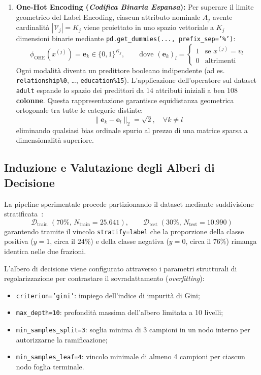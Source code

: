 \begin{enumerate}
    \item \textbf{One-Hot Encoding (\textit{Codifica Binaria Espansa}):}
    Per superare il limite geometrico del Label Encoding, ciascun attributo nominale $A_j$ avente cardinalità $|\mathcal{V}_j| = K_j$ viene proiettato in uno spazio vettoriale a $K_j$ dimensioni binarie mediante \texttt{pd.get\_dummies(..., prefix\_sep='\%')}:
    \begin{equation}
        \phi_{\text{OHE}}(x^{(j)}) = \mathbf{e}_k \in \{0, 1\}^{K_j}, \qquad \text{dove } (\mathbf{e}_k)_l = \begin{cases} 1 & \text{se } x^{(j)} = v_l \\ 0 & \text{altrimenti} \end{cases}
    \end{equation}
    Ogni modalità diventa un predittore booleano indipendente (ad es. \texttt{relationship\%0}, \dots, \texttt{education\%15}). L'applicazione dell'operatore sul dataset \texttt{adult} espande lo spazio dei predittori da $14$ attributi iniziali a ben \textbf{$108$ colonne}. Questa rappresentazione garantisce equidistanza geometrica ortogonale tra tutte le categorie distinte:
    \begin{equation}
        \|\mathbf{e}_k - \mathbf{e}_l\|_2 = \sqrt{2}, \quad \forall k \neq l
    \end{equation}
    eliminando qualsiasi bias ordinale spurio al prezzo di una matrice sparsa a dimensionalità superiore.
\end{enumerate}

\FloatBarrier
\subsection{Induzione e Valutazione degli Alberi di Decisione}
\label{subsec:dm-lab-dt}

La pipeline sperimentale procede partizionando il dataset mediante suddivisione stratificata~\cite{mannocci2026imbalanced}:
\begin{equation}
    \mathcal{D}_{\text{train}} \; (70\%, \, N_{\text{train}} = 25.641), \qquad \mathcal{D}_{\text{test}} \; (30\%, \, N_{\text{test}} = 10.990)
\end{equation}
garantendo tramite il vincolo \texttt{stratify=label} che la proporzione della classe positiva ($y=1$, circa il $24\%$) e della classe negativa ($y=0$, circa il $76\%$) rimanga identica nelle due frazioni.

L'albero di decisione viene configurato attraverso i parametri strutturali di regolarizzazione per contrastare il sovradattamento (\textit{overfitting}):
\begin{itemize}
    \item \texttt{criterion='gini'}: impiego dell'indice di impurità di Gini;
    \item \texttt{max\_depth=10}: profondità massima dell'albero limitata a 10 livelli;
    \item \texttt{min\_samples\_split=3}: soglia minima di 3 campioni in un nodo interno per autorizzarne la ramificazione;
    \item \texttt{min\_samples\_leaf=4}: vincolo minimale di almeno 4 campioni per ciascun nodo foglia terminale.
\end{itemize}

